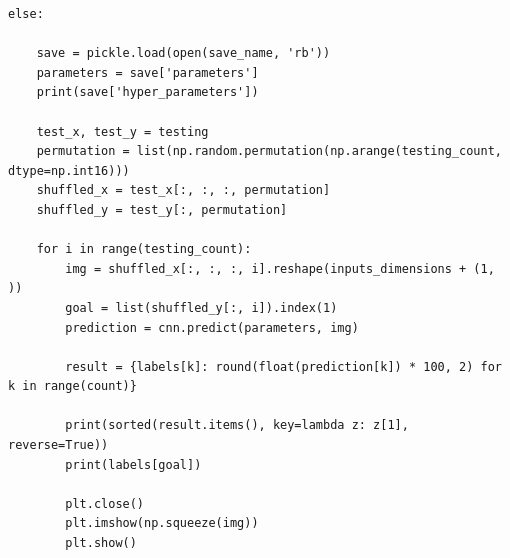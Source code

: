 \documentclass[12pt,a4paper]{extarticle}
\begin{document}
\begin{lstlisting}[mathescape]
else:

    save = pickle.load(open(save_name, 'rb'))
    parameters = save['parameters']
    print(save['hyper_parameters'])

    test_x, test_y = testing
    permutation = list(np.random.permutation(np.arange(testing_count, dtype=np.int16)))
    shuffled_x = test_x[:, :, :, permutation]
    shuffled_y = test_y[:, permutation]

    for i in range(testing_count):
        img = shuffled_x[:, :, :, i].reshape(inputs_dimensions + (1, ))
        goal = list(shuffled_y[:, i]).index(1)
        prediction = cnn.predict(parameters, img)

        result = {labels[k]: round(float(prediction[k]) * 100, 2) for k in range(count)}

        print(sorted(result.items(), key=lambda z: z[1], reverse=True))
        print(labels[goal])

        plt.close()
        plt.imshow(np.squeeze(img))
        plt.show()
\end{lstlisting}
\newpage
\end{document}
